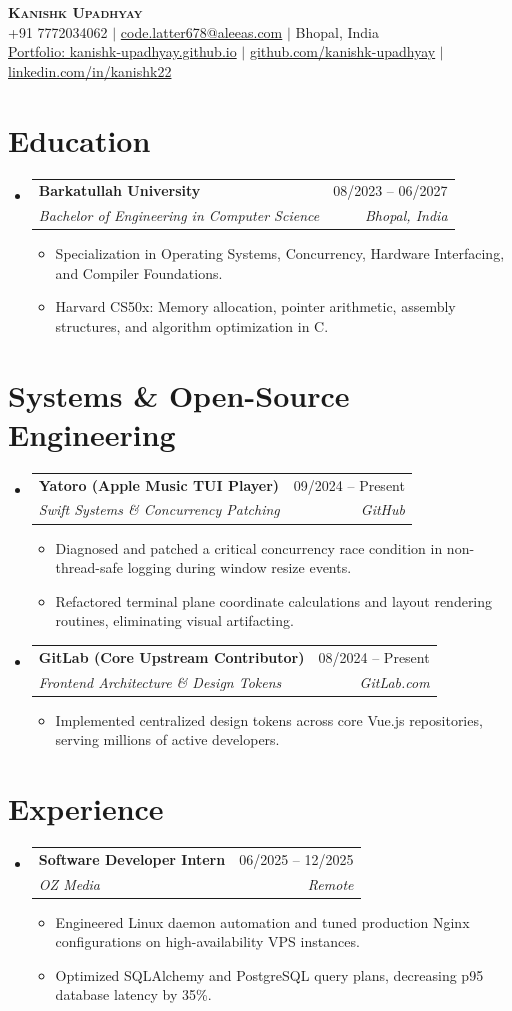 \documentclass[letterpaper,10pt]{article}
\makeatletter
\newcommand{\resumeItem}[1]{\item\small{{#1 \vspace{-2pt}}}}
\newcommand{\resumeSubheading}[4]{
  \vspace{-2pt}\item
    \begin{tabular*}{0.97\textwidth}[t]{l@{\extracolsep{\fill}}r}
      \textbf{#1} & #2 \\
      \textit{\small#3} & \textit{\small #4} \\
    \end{tabular*}\vspace{-7pt}
}
\newcommand{\resumeSubHeadingListStart}{\begin{itemize}[leftmargin=0.15in, label={}]}
\newcommand{\resumeSubHeadingListEnd}{\end{itemize}}
\newcommand{\resumeItemListStart}{\begin{itemize}}
\newcommand{\resumeItemListEnd}{\end{itemize}\vspace{-5pt}}
\makeatother
\begin{document}
\begin{center}
    \textbf{\Huge \scshape Kanishk Upadhyay} \\ \vspace{2pt}
    \small +91 7772034062 $|$ \href{mailto:code.latter678@aleeas.com}{code.latter678@aleeas.com} $|$ Bhopal, India \\
    \href{https://kanishk-upadhyay.github.io/}{Portfolio: kanishk-upadhyay.github.io} $|$ \href{https://github.com/kanishk-upadhyay}{github.com/kanishk-upadhyay} $|$ \href{https://linkedin.com/in/kanishk22}{linkedin.com/in/kanishk22}
\end{center}

\section{Education}
  \resumeSubHeadingListStart
    \resumeSubheading
      {Barkatullah University}{08/2023 -- 06/2027}
      {Bachelor of Engineering in Computer Science}{Bhopal, India}
      \resumeItemListStart
        \resumeItem{Specialization in Operating Systems, Concurrency, Hardware Interfacing, and Compiler Foundations.}
        \resumeItem{Harvard CS50x: Memory allocation, pointer arithmetic, assembly structures, and algorithm optimization in C.}
      \resumeItemListEnd
  \resumeSubHeadingListEnd

\section{Systems \& Open-Source Engineering}
  \resumeSubHeadingListStart
    \resumeSubheading
      {Yatoro (Apple Music TUI Player)}{09/2024 -- Present}
      {Swift Systems \& Concurrency Patching}{GitHub}
      \resumeItemListStart
        \resumeItem{Diagnosed and patched a critical concurrency race condition in non-thread-safe logging during window resize events.}
        \resumeItem{Refactored terminal plane coordinate calculations and layout rendering routines, eliminating visual artifacting.}
      \resumeItemListEnd

    \resumeSubheading
      {GitLab (Core Upstream Contributor)}{08/2024 -- Present}
      {Frontend Architecture \& Design Tokens}{GitLab.com}
      \resumeItemListStart
        \resumeItem{Implemented centralized design tokens across core Vue.js repositories, serving millions of active developers.}
      \resumeItemListEnd
  \resumeSubHeadingListEnd

\section{Experience}
  \resumeSubHeadingListStart
    \resumeSubheading
      {Software Developer Intern}{06/2025 -- 12/2025}
      {OZ Media}{Remote}
      \resumeItemListStart
        \resumeItem{Engineered Linux daemon automation and tuned production Nginx configurations on high-availability VPS instances.}
        \resumeItem{Optimized SQLAlchemy and PostgreSQL query plans, decreasing p95 database latency by 35\%.}
      \resumeItemListEnd
  \resumeSubHeadingListEnd
\end{document}
